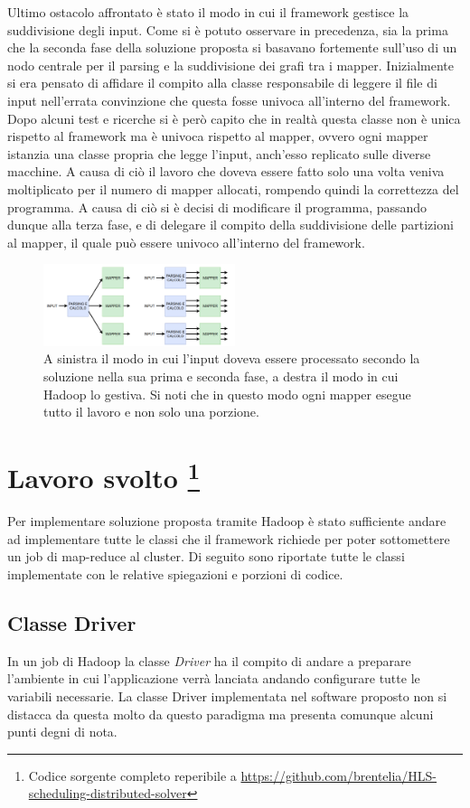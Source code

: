 \documentclass[]{IEEEtran}
\begin{document}
Ultimo ostacolo affrontato è stato il modo in cui il framework gestisce la suddivisione degli input. Come si è potuto osservare in precedenza, sia la prima che la seconda fase della soluzione proposta si basavano fortemente sull'uso di un nodo centrale per il parsing e la suddivisione dei grafi tra i mapper. Inizialmente si era pensato di affidare il compito alla classe responsabile di leggere il file di input nell'errata convinzione che questa fosse univoca all'interno del framework. Dopo alcuni test e ricerche si è però capito che in realtà questa classe non è unica rispetto al framework ma è univoca rispetto al mapper, ovvero ogni mapper istanzia una classe propria che legge l'input, anch'esso replicato sulle diverse macchine. A causa di ciò il lavoro che doveva essere fatto solo una volta veniva moltiplicato per il numero di mapper allocati, rompendo quindi la correttezza del programma. A causa di ciò si è decisi di modificare il programma, passando dunque alla terza fase, e di delegare il compito della suddivisione delle partizioni al mapper, il quale può essere univoco all'interno del framework.
\begin{figure}
	\centering
	\includegraphics[width=0.5\textwidth]{images/hadoop_input.png}
	\caption{A sinistra il modo in cui l'input doveva essere processato secondo la soluzione nella sua prima e seconda fase, a destra il modo in cui Hadoop lo gestiva. Si noti che in questo modo ogni mapper esegue tutto il lavoro e non solo una porzione.}
\end{figure}

\section[Lavoro]{Lavoro svolto \footnote{Codice sorgente completo reperibile a \url{https://github.com/brentelia/HLS-scheduling-distributed-solver}}} \label{work}
Per implementare soluzione proposta tramite Hadoop è stato sufficiente andare ad implementare tutte le classi che il framework richiede per poter sottomettere un job  di map-reduce al cluster. Di seguito sono riportate tutte le classi implementate con le relative spiegazioni e porzioni di codice.
\subsection{Classe Driver}
In un job di Hadoop la classe \emph{Driver} ha il compito di andare a preparare  l'ambiente in cui l'applicazione verrà lanciata andando configurare tutte le variabili necessarie. La classe Driver implementata nel software proposto non si distacca da questa molto da questo paradigma ma presenta comunque alcuni punti degni di nota.
\end{document}
